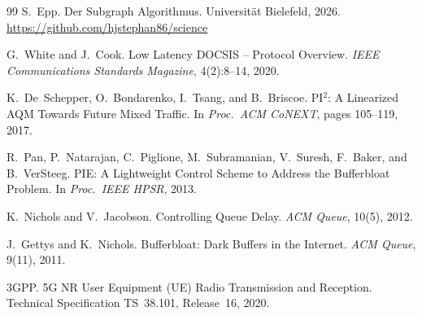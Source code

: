 ﻿\documentclass[a4paper,12pt]{article}
\theoremstyle{definition}
\begin{document}
\begin{thebibliography}{99}
S.~Epp.
\newblock Der Subgraph Algorithmus.
\newblock Universit\"{a}t Bielefeld, 2026.
\newblock \url{https://github.com/hjstephan86/science}

G.~White and J.~Cook.
\newblock Low Latency {DOCSIS} -- Protocol Overview.
\newblock \textit{IEEE Communications Standards Magazine}, 4(2):8--14, 2020.

K.~De~Schepper, O.~Bondarenko, I.~Tsang, and B.~Briscoe.
\newblock PI$^2$: A Linearized AQM Towards Future Mixed Traffic.
\newblock In \textit{Proc.\ ACM CoNEXT}, pages 105--119, 2017.

R.~Pan, P.~Natarajan, C.~Piglione, M.~Subramanian, V.~Suresh, F.~Baker,
  and B.~VerSteeg.
\newblock PIE: A Lightweight Control Scheme to Address the Bufferbloat Problem.
\newblock In \textit{Proc.\ IEEE HPSR}, 2013.

K.~Nichols and V.~Jacobson.
\newblock Controlling Queue Delay.
\newblock \textit{ACM Queue}, 10(5), 2012.

J.~Gettys and K.~Nichols.
\newblock Bufferbloat: Dark Buffers in the Internet.
\newblock \textit{ACM Queue}, 9(11), 2011.

3GPP.
\newblock 5G NR User Equipment (UE) Radio Transmission and Reception.
\newblock Technical Specification TS~38.101, Release~16, 2020.

\end{thebibliography}
\end{document}
